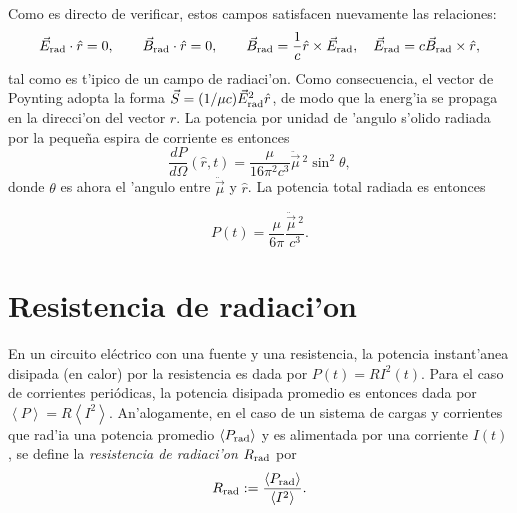 Como es directo de verificar, estos campos satisfacen nuevamente las relaciones:
\begin{equation}
\vec{E}_{\rm rad}\cdot\hat{r}=0, \qquad \vec{B}_{\rm rad}\cdot\hat{r}=0, \qquad \vec{B}_{\rm rad}=\frac{1}{c}\hat{r}\times\vec{E}_{\rm rad}, \quad \vec{E}_{\rm rad}=c\vec{B}_{\rm rad}\times\hat{r},
\end{equation}
tal como es t'ipico de un campo de radiaci'on. Como consecuencia, el vector de Poynting adopta la forma $\vec{S}=(1/\mu c)\vec{E}_{\rm rad}^2\hat{r}$, de modo que la energ'ia se propaga en la direcci'on del vector $\hat{r}$. La potencia por unidad de 'angulo s'olido radiada por la pequeña espira de corriente es entonces
\begin{equation}
\boxed{\frac{dP}{d\Omega}(\hat{r},t)=\frac{\mu}{16\pi^2 c^3}\ddot{\vec{\mu}}{\,}^2\sin^2\theta ,}
\end{equation}
donde $\theta$ es ahora el 'angulo entre $\ddot{\vec{\mu}}$ y $\hat{r}$. La potencia total radiada es entonces

\begin{equation}\label{Pdipmag}
\boxed{P(t)=\frac{\mu}{6\pi}\frac{\ddot{\vec{\mu}}{\,}^2}{c^3}.}
\end{equation}

\section{Resistencia de radiaci'on}

En un circuito eléctrico con una fuente y una resistencia, la potencia instant'anea disipada (en calor) por la resistencia es dada por $P(t)=RI^2(t)$. Para el caso de corrientes periódicas, la potencia disipada promedio es entonces dada por $\left\langle P\right\rangle=R\left\langle I^2\right\rangle$.
An'alogamente, en el caso de un sistema de cargas y corrientes que rad'ia una potencia promedio $\left\langle P_{\rm rad}\right\rangle$ y es alimentada por una corriente $I(t)$, se define la \textit{resistencia de radiaci'on} $R_{\rm rad}$ por
\begin{equation}
R_{\rm rad}:=\frac{\left\langle P_{\rm rad}\right\rangle}{\left\langle I^2\right\rangle}.
\end{equation}

